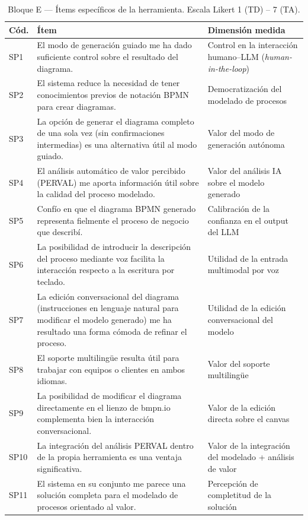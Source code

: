 \begin{table}[htbp]
\centering
\caption{Bloque E --- Ítems específicos de la herramienta. Escala Likert 1 (TD) -- 7 (TA).}
\label{tab:especificos}
\begin{tabular}{@{} p{0.7cm} @{\hspace{0.8cm}} p{6.8cm} p{5.0cm} @{}}
\hline
\rule{0pt}{10pt}\textbf{Cód.} & \textbf{Ítem} & \textbf{Dimensión medida} \\
\hline
\rule{0pt}{10pt}SP1 &
  El modo de generación guiado me ha dado suficiente control sobre el resultado del diagrama. &
  Control en la interacción humano--LLM (\textit{human-in-the-loop}) \\[8pt]
SP2 &
  El sistema reduce la necesidad de tener conocimientos previos de notación BPMN para crear diagramas. &
  Democratización del modelado de procesos \\[8pt]
SP3 &
  La opción de generar el diagrama completo de una sola vez (sin confirmaciones intermedias) es una alternativa útil al modo guiado. &
  Valor del modo de generación autónoma \\[8pt]
SP4 &
  El análisis automático de valor percibido (PERVAL) me aporta información útil sobre la calidad del proceso modelado. &
  Valor del análisis IA sobre el modelo generado \\[8pt]
SP5 &
  Confío en que el diagrama BPMN generado representa fielmente el proceso de negocio que describí. &
  Calibración de la confianza en el output del LLM \\[8pt]
SP6 &
  La posibilidad de introducir la descripción del proceso mediante voz facilita la interacción respecto a la escritura por teclado. &
  Utilidad de la entrada multimodal por voz \\[8pt]
SP7 &
  La edición conversacional del diagrama (instrucciones en lenguaje natural para modificar el modelo generado) me ha resultado una forma cómoda de refinar el proceso. &
  Utilidad de la edición conversacional del modelo \\[4pt]
SP8 & 
El soporte multilingüe resulta útil para trabajar con equipos o clientes en ambos idiomas. & 
Valor del soporte multilingüe \\[4pt]

SP9 &
La posibilidad de modificar el diagrama directamente en el lienzo de bmpn.io complementa bien la interacción conversacional.& 
Valor de la edición directa sobre el canvas \\[4pt]

SP10 &
La integración del análisis PERVAL dentro de la propia herramienta es una ventaja significativa. & 
Valor de la integración del modelado + análisis de valor \\[4pt]

SP11 & El sistema en su conjunto me parece una solución completa para el modelado de procesos orientado al valor. & 
Percepción de completitud de la solución \\[4pt]

\hline
\end{tabular}
\end{table}

